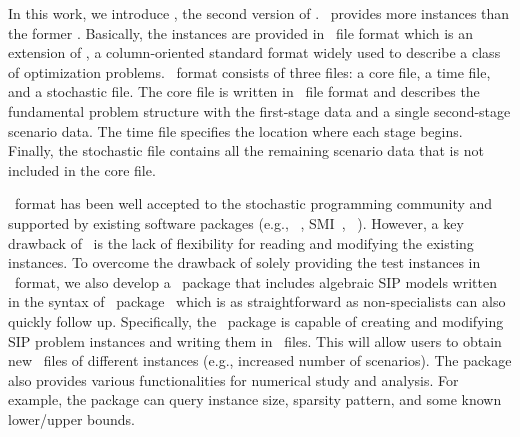 \textcolor{NavyBlue}{In this work, we introduce \siplibtwo, the second version of \siplib. \siplibtwo\ provides more instances than the former \siplib. Basically, the instances are provided in \smps\ file format \cite{smps} which is an extension of \mps, a column-oriented standard format widely used to describe a class of optimization problems. \smps\ format consists of three files: a core file, a time file, and a stochastic file. The core file is written in \mps\ file format and describes the fundamental problem structure with the first-stage data and a single second-stage scenario data. The time file specifies the location where each stage begins. Finally, the stochastic file contains all the remaining scenario data that is not included in the core file.} 

\textcolor{NavyBlue}{\smps\ format has been well accepted to the stochastic programming community and supported by existing software packages (e.g., {\dsp}~\cite{web:DSP}, \textsf{SMI}~\cite{web:SMI}, {\scip}~\cite{SCIP}). However, a key drawback of \smps\ is the lack of flexibility for reading and modifying the existing instances. To overcome the drawback of solely providing the test instances in \smps\ format, we also develop a \julia\ package that includes algebraic SIP models written in the syntax of \structjump\ package~\cite{web:StructJuMP} which is as straightforward as non-specialists can also quickly follow up. Specifically, the \julia\ package is capable of creating and modifying SIP problem instances and writing them in \smps\ files. This will allow users to obtain new \smps\ files of different instances (e.g., increased number of scenarios). The package also provides various functionalities for numerical study and analysis. For example, the package can query instance size, sparsity pattern, and some known lower/upper bounds. } 


